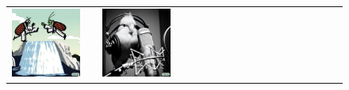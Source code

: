\begin{figure}[ht!]
\begin{adjustwidth}{-0.8in}{-0.5in}
\begin{tabular}{cccccccccccccccccccc}
\multicolumn{2}{c}{\includegraphics[width=\threebythreecolwidth\textwidth]{figures/cherries/beetles_2.jpg}} &&
\multicolumn{2}{c}{\includegraphics[width=\threebythreecolwidth\textwidth]{figures/cherries/bird_sing4.jpg}} &

\end{tabular}
\end{adjustwidth}
\end{figure}
